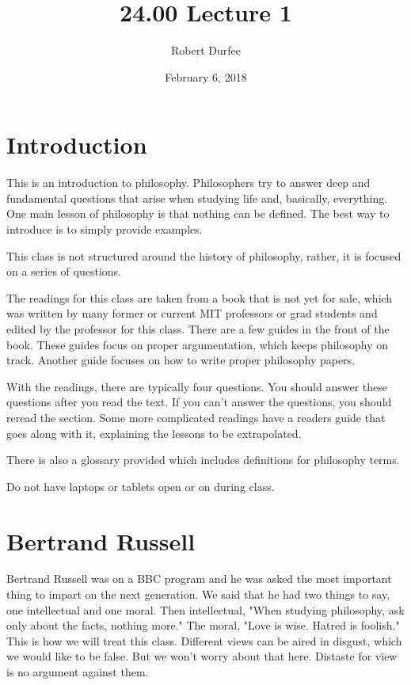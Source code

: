 \documentclass{article}
\title{ 24.00 Lecture 1 }
\author{ Robert Durfee }
\date{ February 6, 2018 }
\begin{document}
\maketitle

\section{ Introduction }

This is an introduction to philosophy. Philosophers try to answer deep and
fundamental questions that arise when studying life and, basically, everything.
One main lesson of philosophy is that nothing can be defined. The best way to
introduce is to simply provide examples.

This class is not structured around the history of philosophy, rather, it is
focused on a series of questions.

The readings for this class are taken from a book that is not yet for sale,
which was written by many former or current MIT professors or grad students and
edited by the professor for this class. There are a few guides in the front of
the book. These guides focus on proper argumentation, which keeps philosophy on
track. Another guide focuses on how to write proper philosophy papers.

With the readings, there are typically four questions. You should answer these
questions after you read the text. If you can't answer the questions, you should
reread the section. Some more complicated readings have a readers guide that
goes along with it, explaining the lessons to be extrapolated.

There is also a glossary provided which includes definitions for philosophy
terms.

Do not have laptops or tablets open or on during class.

\section{Bertrand Russell}

Bertrand Russell was on a BBC program and he was asked the most important thing
to impart on the next generation. We said that he had two things to say, one
intellectual and one moral. Then intellectual, "When studying philosophy, ask
only about the facts, nothing more." The moral, "Love is wise. Hatred is
foolish." This is how we will treat this class. Different views can be aired in
disgust, which we would like to be false. But we won't worry about that here.
Distaste for view is no argument against them.
\end{document}
